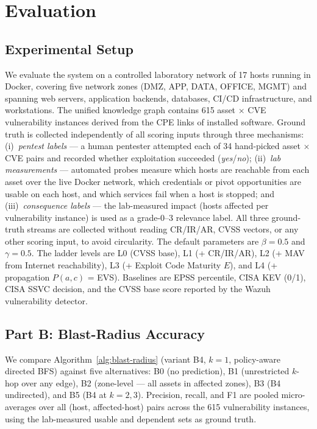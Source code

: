 \documentclass[conference]{IEEEtran}
\begin{document}
\section{Evaluation}

\subsection{Experimental Setup}

We evaluate the system on a controlled laboratory network of 17 hosts running in Docker, covering five network zones (DMZ, APP, DATA, OFFICE, MGMT) and spanning web servers, application backends, databases, CI/CD infrastructure, and workstations. The unified knowledge graph contains 615 asset $\times$ CVE vulnerability instances derived from the CPE links of installed software. Ground truth is collected independently of all scoring inputs through three mechanisms: (i)~\emph{pentest labels} — a human pentester attempted each of 34 hand-picked asset $\times$ CVE pairs and recorded whether exploitation succeeded (\textit{yes}/\textit{no}); (ii)~\emph{lab measurements} — automated probes measure which hosts are reachable from each asset over the live Docker network, which credentials or pivot opportunities are usable on each host, and which services fail when a host is stopped; and (iii)~\emph{consequence labels} — the lab-measured impact (hosts affected per vulnerability instance) is used as a grade-0--3 relevance label. All three ground-truth streams are collected without reading CR/IR/AR, CVSS vectors, or any other scoring input, to avoid circularity. The default parameters are $\beta = 0.5$ and $\gamma = 0.5$. The ladder levels are L0 (CVSS base), L1 (+ CR/IR/AR), L2 (+ MAV from Internet reachability), L3 (+ Exploit Code Maturity $E$), and L4 (+ propagation $P(a,c)$ = EVS). Baselines are EPSS percentile, CISA KEV (0/1), CISA SSVC decision, and the CVSS base score reported by the Wazuh vulnerability detector.

\subsection{Part B: Blast-Radius Accuracy}

We compare Algorithm~\ref{alg:blast-radius} (variant B4, $k=1$, policy-aware directed BFS) against five alternatives: B0 (no prediction), B1 (unrestricted $k$-hop over any edge), B2 (zone-level — all assets in affected zones), B3 (B4 undirected), and B5 (B4 at $k=2,3$). Precision, recall, and F1 are pooled micro-averages over all (host, affected-host) pairs across the 615 vulnerability instances, using the lab-measured usable and dependent sets as ground truth.
\end{document}
